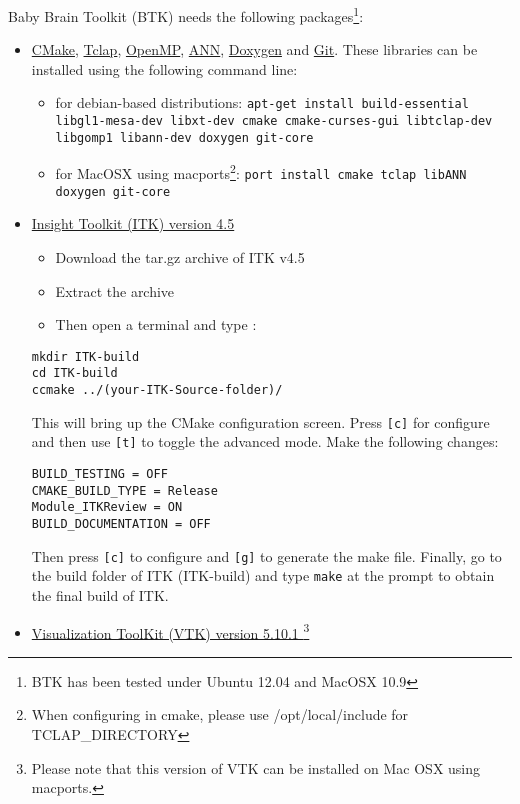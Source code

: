 \documentclass[a4paper,10pt]{article}
\begin{document}
Baby Brain Toolkit (BTK) needs the following packages\footnote{BTK has been tested under Ubuntu 12.04 and MacOSX 10.9}:
\begin{itemize}
 \item \href{http://www.cmake.org}{CMake}, \href{http://tclap.sourceforge.net}{Tclap}, \href{http://openmp.org}{OpenMP}, \href{http://www.cs.umd.edu/\string~mount/ANN}{ANN}, \href{http://www.doxygen.org}{Doxygen} and \href{http://git-scm.com/}{Git}. These libraries can be installed using the following command line:
 \begin{itemize}
 \item for debian-based distributions: \texttt{apt-get install build-essential libgl1-mesa-dev libxt-dev cmake cmake-curses-gui libtclap-dev libgomp1 libann-dev  doxygen git-core}
 \item for MacOSX using macports\footnote{When configuring in cmake, please use /opt/local/include for TCLAP\_DIRECTORY}: \texttt{port install cmake tclap libANN doxygen git-core}
 \end{itemize}
 \item \href{http://www.itk.org/ITK/resources/software.html}{Insight Toolkit (ITK) version 4.5}
 \begin{itemize}
 \item Download the tar.gz archive of ITK v4.5
 \item Extract the archive 
 \item Then open a terminal and type :
 \end{itemize}
\begin{verbatim}
mkdir ITK-build
cd ITK-build
ccmake ../(your-ITK-Source-folder)/
\end{verbatim}
This will bring up the CMake configuration screen. Press \texttt{[c]} for
configure and then use \texttt{[t]} to toggle the advanced mode. Make the
following changes:
\begin{verbatim}
BUILD_TESTING = OFF
CMAKE_BUILD_TYPE = Release
Module_ITKReview = ON
BUILD_DOCUMENTATION = OFF
\end{verbatim}
Then press \texttt{[c]} to configure and \texttt{[g]} to generate the make file.
Finally, go to the build folder of ITK (ITK-build) and type \texttt{make} at the prompt to obtain the final build of ITK.
   \item \href{http://www.vtk.org/VTK/resources/software.html#previous}{Visualization ToolKit (VTK) version 5.10.1 }\footnote{Please note that this version of VTK can be installed on Mac OSX using macports.}
 \begin{itemize}

\end{itemize}
\end{itemize}
\end{document}
